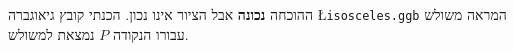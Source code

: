 \documentclass[12pt,a4paper]{article}
\begin{document}
ההוכחה
\textbf{%
נכונה%
}
אבל הציור אינו נכון. הכנתי קובץ גיאוגברה
\L{\texttt{isosceles.ggb}}
המראה משולש עבורו הנקודה
$P$
נמצאת 
\textbf{}
למשולש.





\newpage


\renewcommand{\refname}{\raggedleft\Large\R{מקורות}}

\end{document}
